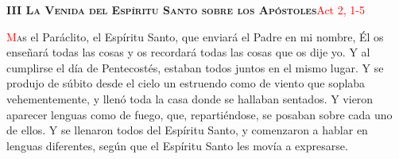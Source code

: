 \noindent\textbf{\textsc{III La Venida del Espíritu Santo sobre los Apóstoles}}\hfill\textcolor{red}{Act 2, 1-5}

\vspace{0.25em}

\lettrine[lines=2]{\textcolor{red}{M}}as el Paráclito, el Espíritu Santo, que enviará el Padre en mi nombre, Él os enseñará todas las cosas y os recordará todas las cosas que os dije yo.
Y al cumplirse el día de Pentecostés, estaban todos juntos en el mismo lugar. Y se produjo de súbito desde el cielo un estruendo como de viento que soplaba vehementemente,
y llenó toda la casa donde se hallaban sentados. Y vieron aparecer lenguas como de fuego, que, repartiéndose, se posaban sobre cada uno de ellos. Y se llenaron todos del Espíritu Santo,
y comenzaron a hablar en lenguas diferentes, según que el Espíritu Santo les movía a expresarse.
